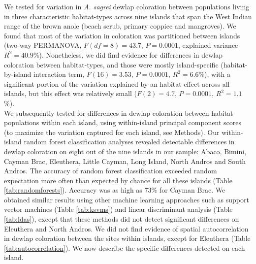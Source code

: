
We tested for variation in \textit{A. sagrei} dewlap coloration between populations living in three characteristic habitat-types across nine islands that span the West Indian range of the brown anole (beach scrub, primary coppice and mangroves). We found that most of the variation in coloration was partitioned between islands (two-way PERMANOVA, $F(df = 8) = 43.7$, $P = 0.0001$, explained variance $R^2 = 40.9$\%). Nonetheless, we did find evidence for differences in dewlap coloration between habitat-types, and those were mostly island-specific (habitat-by-island interaction term, $F(16) = 3.53$, $P = 0.0001$, $R^2 = 6.6$\%), with a significant portion of the variation explained by an habitat effect across all islands, but this effect was relatively small ($F(2) = 4.7$, $P = 0.0001$, $R^2 = 1.1$\%).\\

We subsequently tested for differences in dewlap coloration between habitat-populations within each island, using within-island principal component scores (to maximize the variation captured for each island, see Methods). Our within-island random forest classification analyses revealed detectable differences in dewlap coloration on eight out of the nine islands in our sample: Abaco, Bimini, Cayman Brac, Eleuthera, Little Cayman, Long Island, North Andros and South Andros. The accuracy of random forest classification exceeded random expectation more often than expected by chance for all these islands (Table \ref{tab:randomforests}). Accuracy was as high as 73\% for Cayman Brac. We obtained similar results using other machine learning approaches such as support vector machines (Table \ref{tab:ksvms}) and linear discriminant analysis (Table \ref{tab:ldas}), except that these methods did not detect significant differences on Eleuthera and North Andros. We did not find evidence of spatial autocorrelation in dewlap coloration between the sites within islands, except for Eleuthera (Table \ref{tab:autocorrelation}). We now describe the specific differences detected on each island.\\

